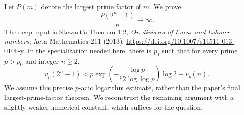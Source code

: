 Let $P(m)$ denote the largest prime factor of $m$. We prove
\[
 \frac{P(2^n-1)}n\longrightarrow\infty.
\]
The deep input is Stewart's Theorem 1.2, \emph{On divisors of Lucas and Lehmer numbers}, Acta Mathematica 211 (2013), \url{https://doi.org/10.1007/s11511-013-0105-y}. In the specialization needed here, there is $p_0$ such that for every prime $p>p_0$ and integer $n\ge2$,
\[
 v_p(2^n-1)<p\exp\!\left(-\frac{\log p}{52\log\log p}\right)\log2+v_p(n). \tag{1}
\]
We assume this precise $p$-adic logarithm estimate, rather than the paper's final largest-prime-factor theorem. We reconstruct the remaining argument with a slightly weaker numerical constant, which suffices for the question.
